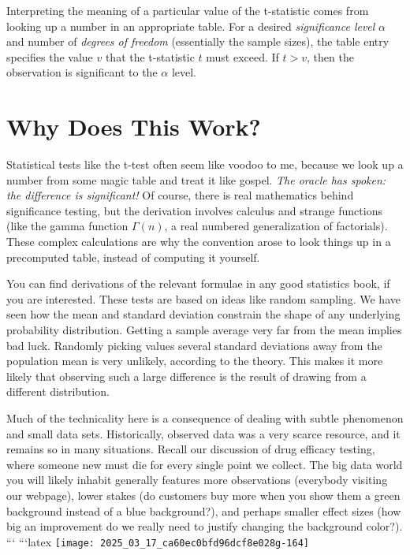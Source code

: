 \documentclass[10pt]{article}
\begin{document}
Interpreting the meaning of a particular value of the t-statistic comes from looking up a number in an appropriate table. For a desired \textit{significance level} $\alpha$ and number of \textit{degrees of freedom} (essentially the sample sizes), the table entry specifies the value $v$ that the t-statistic $t$ must exceed. If $t > v$, then the observation is significant to the $\alpha$ level.

\section*{Why Does This Work?}
Statistical tests like the t-test often seem like voodoo to me, because we look up a number from some magic table and treat it like gospel. \textit{The oracle has spoken: the difference is significant!} Of course, there is real mathematics behind significance testing, but the derivation involves calculus and strange functions (like the gamma function $\Gamma(n)$, a real numbered generalization of factorials). These complex calculations are why the convention arose to look things up in a precomputed table, instead of computing it yourself.

You can find derivations of the relevant formulae in any good statistics book, if you are interested. These tests are based on ideas like random sampling. We have seen how the mean and standard deviation constrain the shape of any underlying probability distribution. Getting a sample average very far from the mean implies bad luck. Randomly picking values several standard deviations away from the population mean is very unlikely, according to the theory. This makes it more likely that observing such a large difference is the result of drawing from a different distribution.

Much of the technicality here is a consequence of dealing with subtle phenomenon and small data sets. Historically, observed data was a very scarce resource, and it remains so in many situations. Recall our discussion of drug efficacy testing, where someone new must die for every single point we collect. The big data world you will likely inhabit generally features more observations (everybody visiting our webpage), lower stakes (do customers buy more when you show them a green background instead of a blue background?), and perhaps smaller effect sizes (how big an improvement do we really need to justify changing the background color?).
```
```latex
\texttt{[image: 2025\_03\_17\_ca60ec0bfd96dcf8e028g-164]}
\end{document}
